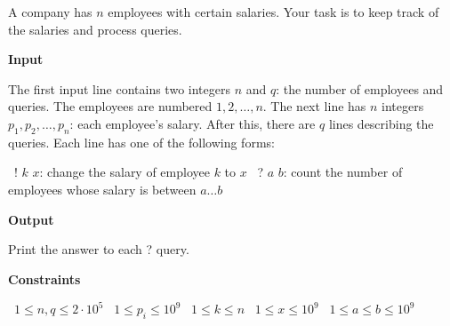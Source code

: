 A company has $n$ employees with certain salaries. Your task is to keep track of the salaries and process queries.

\vspace{0.3cm}\noindent\textbf{Input}

The first input line contains two integers $n$ and $q$: the number of employees and queries. The employees are numbered $1,2,\ldots,n$.
The next line has $n$ integers $p_1,p_2,\ldots,p_n$: each employee's salary.
After this, there are $q$ lines describing the queries. Each line has one of the following forms:

\textbullet\ ! $k$ $x$: change the salary of employee $k$ to $x$
\textbullet\ ? $a$ $b$: count the number of employees whose salary is between $a \ldots b$

\vspace{0.3cm}\noindent\textbf{Output}

Print the answer to each ? query.

\vspace{0.3cm}\noindent\textbf{Constraints}

\textbullet\ $1 \le n, q \le 2 \cdot 10^5$
\textbullet\ $1 \le p_i \le 10^9$
\textbullet\ $1 \le k \le n$
\textbullet\ $1 \le x \le 10^9$
\textbullet\ $1 \le a \le b \le 10^9$